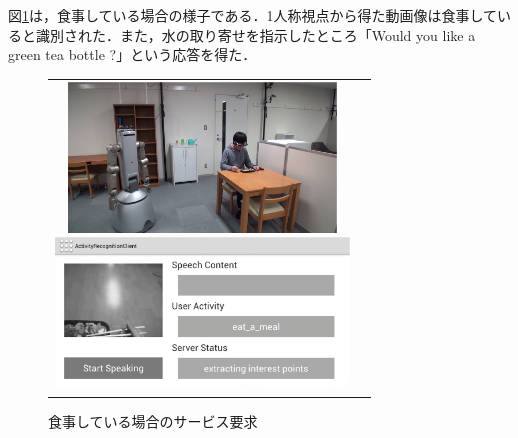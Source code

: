 図{\ref{fig:experiment_2_water_2}}は，食事している場合の様子である．1人称視点から得た動画像は食事していると識別された．また，水の取り寄せを指示したところ「Would you like a green tea bottle ?」という応答を得た．
%
\vspace{5mm}
\begin{figure}[htbp]
\begin{tabular}{cc}
%
  \begin{minipage}{0.5\textwidth}
    \begin{center}
      \includegraphics[height=40mm]{figure/experiment_2_water_2.eps}
    \end{center}
  \end{minipage}
%
  \begin{minipage}{0.5\textwidth}
    \begin{center}
      \includegraphics[height=40mm]{figure/experiment_2_water_2_a.eps}
    \end{center}
  \end{minipage}
%
\end{tabular}
\caption{食事している場合のサービス要求}
\label{fig:experiment_2_water_2}
\end{figure}

